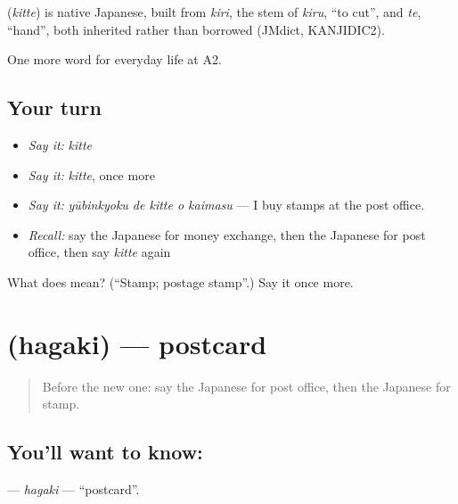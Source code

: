 \begin{cousinweb}
\textbf{} (\emph{kitte}) is native Japanese, built from \emph{kiri}, the stem of \emph{kiru}, \textquotedblleft{}to cut\textquotedblright{}, and \emph{te}, \textquotedblleft{}hand\textquotedblright{}, both inherited rather than borrowed (JMdict, KANJIDIC2).
\end{cousinweb}

\begin{grammarlens}[title={What you've built}]
One more word for everyday life at A2.
\end{grammarlens}

\subsection*{Your turn}
\begin{itemize}
\raggedright
  \item \emph{Say it:} \emph{kitte}
  \item \emph{Say it:} \emph{kitte}, once more
  \item \emph{Say it:} \emph{yūbinkyoku de kitte o kaimasu} — I buy stamps at the post office.
  \item \emph{Recall:} say the Japanese for money exchange, then the Japanese for post office, then say \emph{kitte} again
\end{itemize}

\begin{tcolorbox}[breakable,colback=teal!4,colframe=teal!35!black,title={Before you move on}]
What does  mean? (\textquotedblleft{}Stamp; postage stamp\textquotedblright{}.) Say it once more.
\end{tcolorbox}
\section[\texorpdfstring{\ja{はがき} (hagaki)}{はがき (hagaki)}]{ (hagaki) — postcard}

\label{lesson:JA-C188-hagaki}



\begin{quote}
Before the new one: say the Japanese for post office, then the Japanese for stamp.
\end{quote}

\subsection*{You'll want to know: }
\textbf{} — \emph{hagaki} — \textquotedblleft{}postcard\textquotedblright{}.

